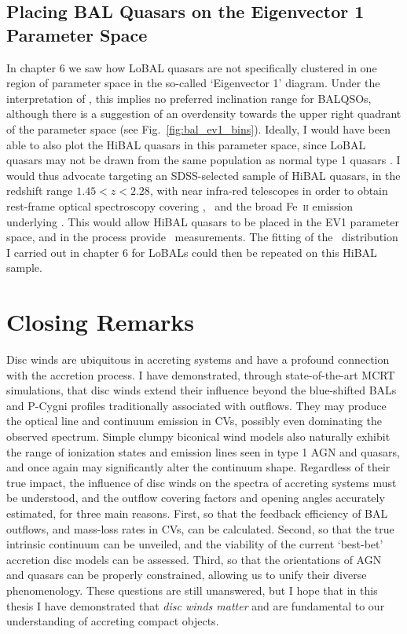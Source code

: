 \subsection{Placing BAL Quasars on the Eigenvector 1 Parameter Space}

In chapter 6 we saw how LoBAL quasars are not specifically clustered
in one region of parameter space in the so-called `Eigenvector 1'
diagram. Under the interpretation of \cite{shenho2014}, this implies
no preferred inclination range for BALQSOs, although there is a suggestion
of an overdensity towards the upper right quadrant of the parameter space 
(see Fig.~\ref{fig:bal_ev1_bins}). Ideally, I would have been able to
also plot the HiBAL quasars in this parameter space, since LoBAL quasars
may not be drawn from the same population as normal type 1 quasars 
\citep[e.g.][]{urrutia2009,dai2012}. I would thus advocate targeting an
SDSS-selected sample of HiBAL quasars, in the redshift range $1.45<z<2.28$,
with near infra-red telescopes in order 
to obtain rest-frame optical spectroscopy covering
\hb, \oiiifull\ and the broad Fe~\textsc{ii} emission underlying \hb. This
would allow HiBAL quasars to be placed in the EV1 parameter space, and in the 
process provide \ewo\ measurements. The fitting of the \ewo\ distribution
I carried out in chapter 6 for LoBALs could then be repeated on this HiBAL sample.

\section{Closing Remarks}

Disc winds are ubiquitous in accreting systems and have a 
profound connection with the accretion process. I have demonstrated,
through state-of-the-art MCRT simulations, that disc winds extend their
influence beyond the blue-shifted BALs and P-Cygni profiles traditionally
associated with outflows. They may produce the optical line and continuum emission
in CVs, possibly even dominating the observed spectrum. Simple clumpy biconical
wind models also naturally exhibit the range of ionization states
and emission lines seen in type 1 AGN and quasars, and once again
may significantly alter the continuum shape. Regardless of their true
impact, the influence of disc winds on the spectra of accreting systems
must be understood, and the outflow covering factors and opening angles 
accurately estimated, for three main reasons. First, so that the feedback 
efficiency of BAL outflows, and mass-loss rates in CVs,
can be calculated. Second, so that the true intrinsic continuum can be unveiled, and 
the viability of the current `best-bet' accretion disc models can be assessed. 
Third, so that the orientations of AGN and quasars can be properly constrained,
allowing us to unify their diverse phenomenology. 
These questions are still unanswered, but I hope that in this thesis I have
demonstrated that {\em disc winds matter} and are fundamental
to our understanding of accreting compact objects.